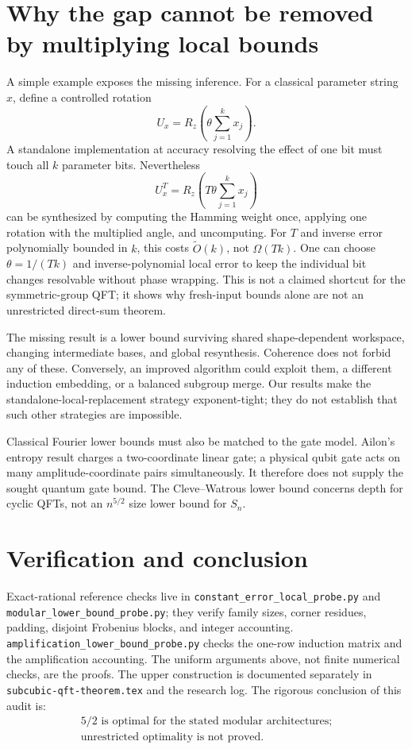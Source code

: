 \documentclass[11pt]{article}
\theoremstyle{definition}
\begin{document}
\section{Why the gap cannot be removed by multiplying local bounds}

A simple example exposes the missing inference. For a classical parameter
string $x$, define a controlled rotation
\[
 U_x=R_z\left(\theta\sum_{j=1}^k x_j\right).
\]
A standalone implementation at accuracy resolving the effect of one bit
must touch all $k$ parameter bits. Nevertheless
\[
 U_x^T=R_z\left(T\theta\sum_{j=1}^k x_j\right)
\]
can be synthesized by computing the Hamming weight once, applying one
rotation with the multiplied angle, and uncomputing. For $T$ and inverse
error polynomially bounded in $k$, this costs $\widetilde O(k)$, not
$\Omega(Tk)$.
One can choose $\theta=1/(Tk)$ and inverse-polynomial local error to
keep the individual bit changes resolvable without phase wrapping.
This is not a claimed shortcut for the symmetric-group QFT; it shows why
fresh-input bounds alone are not an unrestricted direct-sum theorem.

The missing result is a lower bound surviving shared shape-dependent
workspace, changing intermediate bases, and global resynthesis. Coherence
does not forbid any of these. Conversely, an improved algorithm could
exploit them, a different induction embedding, or a balanced subgroup merge.
Our results make the standalone-local-replacement strategy exponent-tight;
they do not establish that such other strategies are impossible.

Classical Fourier lower bounds must also be matched to the gate model.
Ailon's entropy result \cite{Ailon} charges a two-coordinate linear gate;
a physical qubit gate acts on many amplitude-coordinate pairs simultaneously.
It therefore does not supply the sought quantum gate bound. The
Cleve--Watrous lower bound \cite{CW} concerns depth for cyclic QFTs, not
an $n^{5/2}$ size lower bound for $S_n$.

\section{Verification and conclusion}

Exact-rational reference checks live in
\texttt{constant\_error\_local\_probe.py} and
\texttt{modular\_lower\_bound\_probe.py}; they verify family sizes,
corner residues, padding, disjoint Frobenius blocks, and integer accounting.
\texttt{amplification\_lower\_bound\_probe.py} checks the one-row induction
matrix and the amplification accounting. The uniform arguments above,
not finite numerical checks, are the proofs. The upper construction is
documented separately in \texttt{subcubic-qft-theorem.tex} and the research
log. The rigorous conclusion of this audit is:
\[
 \boxed{\begin{gathered}
 \text{$5/2$ is optimal for the stated modular architectures;}\\
 \text{unrestricted optimality is not proved.}
 \end{gathered}}
\]
\end{document}
